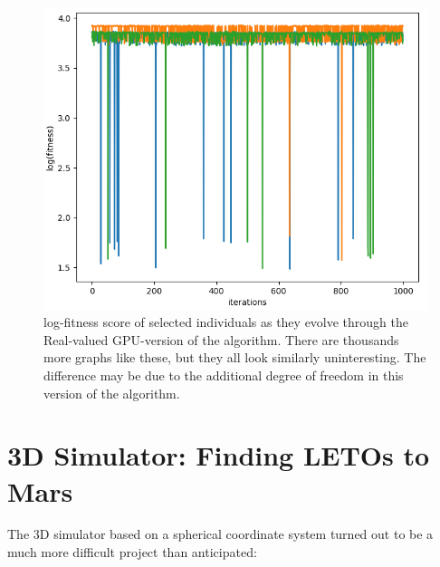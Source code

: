 \begin{figure}[ht]
    \centering
    \includegraphics[width=0.6\linewidth]{fig/GPUresults.png}
    \caption{log-fitness score of selected individuals as they evolve through the Real-valued GPU-version of the algorithm. There are thousands more graphs like these, but they all look similarly uninteresting. The difference may be due to the additional degree of freedom in this version of the algorithm.}
    \label{fig:GPUresults}
\end{figure}

\clearpage

\section{3D Simulator: Finding LETOs to Mars}
The 3D simulator based on a spherical coordinate system turned out to be a much more difficult project than anticipated:

